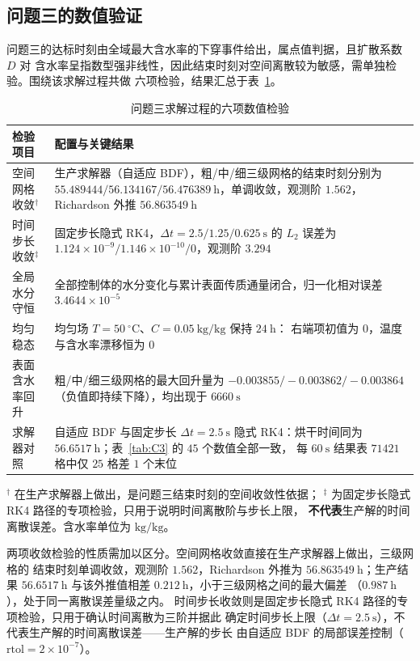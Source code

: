 \documentclass[12pt,a4paper]{ctexart}
\begin{document}
\subsection{问题三的数值验证}

问题三的达标时刻由全域最大含水率的下穿事件给出，属点值判据，且扩散系数 $D$ 对
含水率呈指数型强非线性，因此结束时刻对空间离散较为敏感，需单独检验。围绕该求解过程共做
六项检验，结果汇总于表~\ref{tab:app_q3}。

\begin{table}[H]
\centering
\small
\setlength{\tabcolsep}{4pt}
\begin{tabularx}{\textwidth}{@{}lX@{}}
\toprule
检验项目 & 配置与关键结果 \\
\midrule
空间网格收敛$^{\dagger}$ & 生产求解器（自适应 BDF），粗/中/细三级网格的结束时刻分别为
$55.489444/56.134167/56.476389\ \mathrm{h}$，单调收敛，观测阶 $1.562$，
Richardson 外推 $56.863549\ \mathrm{h}$ \\
时间步长收敛$^{\ddagger}$ & 固定步长隐式 RK4，$\Delta t=2.5/1.25/0.625\ \mathrm{s}$ 的
$L_2$ 误差为 $1.124\times10^{-9}/1.146\times10^{-10}/0$，观测阶 $3.294$ \\
全局水分守恒 & 全部控制体的水分变化与累计表面传质通量闭合，归一化相对误差
$3.4644\times10^{-5}$ \\
均匀稳态 & 均匀场 $T=50\ {}^\circ\mathrm{C}$、$C=0.05\ \mathrm{kg/kg}$ 保持 $24\ \mathrm{h}$：
右端项初值为 $0$，温度与含水率漂移恒为 $0$ \\
表面含水率回升 & 粗/中/细三级网格的最大回升量为
$-0.003855/-0.003862/-0.003864$（负值即持续下降），均出现于 $6660\ \mathrm{s}$ \\
求解器对照 & 自适应 BDF 与固定步长 $\Delta t=2.5\ \mathrm{s}$ 隐式 RK4：烘干时间同为
$56.6517\ \mathrm{h}$；表~\ref{tab:C3} 的 $45$ 个数值全部一致，
每 $60\ \mathrm{s}$ 结果表 $71421$ 格中仅 $25$ 格差 $1$ 个末位 \\
\bottomrule
\end{tabularx}

\vspace{2pt}
{\footnotesize $^{\dagger}$ 在生产求解器上做出，是问题三结束时刻的空间收敛性依据；
$^{\ddagger}$ 为固定步长隐式 RK4 路径的专项检验，只用于说明时间离散阶与步长上限，
\textbf{不代表}生产解的时间离散误差。含水率单位为 $\mathrm{kg/kg}$。}
\caption{问题三求解过程的六项数值检验}
\label{tab:app_q3}
\end{table}

两项收敛检验的性质需加以区分。空间网格收敛直接在生产求解器上做出，三级网格的
结束时刻单调收敛，观测阶 $1.562$，Richardson 外推为 $56.863549\ \mathrm{h}$；生产结果
$56.6517\ \mathrm{h}$ 与该外推值相差 $0.212\ \mathrm{h}$，小于三级网格之间的最大偏差
（$0.987\ \mathrm{h}$），处于同一离散误差量级之内。
时间步长收敛则是固定步长隐式 RK4 路径的专项检验，只用于确认时间离散为三阶并据此
确定时间步长上限（$\Delta t=2.5\ \mathrm{s}$），不代表生产解的时间离散误差——生产解的步长
由自适应 BDF 的局部误差控制（$\mathrm{rtol}=2\times10^{-7}$）。
\end{document}
